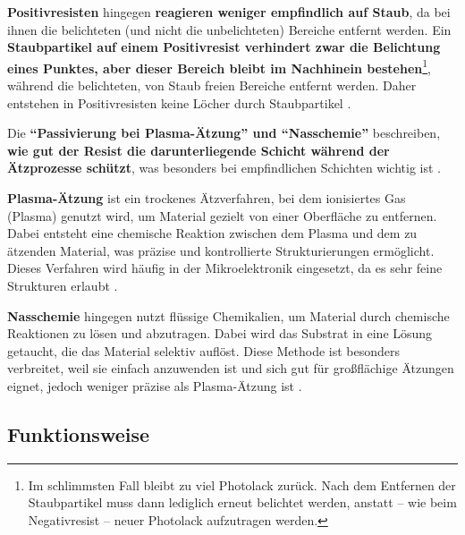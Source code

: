 \documentclass{article} %
\begin{document}
\textbf{Positivresisten} hingegen \textbf{reagieren weniger empfindlich auf Staub}, da bei ihnen die belichteten (und nicht die unbelichteten) Bereiche entfernt werden. Ein \textbf{Staubpartikel auf einem Positivresist verhindert zwar die Belichtung eines Punktes, aber dieser Bereich bleibt im Nachhinein bestehen}\footnote{Im schlimmsten Fall bleibt zu viel Photolack zurück. Nach dem Entfernen der Staubpartikel muss dann lediglich erneut belichtet werden, anstatt -- wie beim Negativresist -- neuer Photolack aufzutragen werden.}, während die belichteten, von Staub freien Bereiche entfernt werden. Daher entstehen in Positivresisten keine Löcher durch Staubpartikel \cite{wias_photoresist}.

\vspace{1em}

Die \textbf{``Passivierung bei Plasma-Ätzung'' und ``Nasschemie''} beschreiben, \textbf{wie gut der Resist die darunterliegende Schicht während der Ätzprozesse schützt}, was besonders bei empfindlichen Schichten wichtig ist \cite{schmid2024CVD}. 

\vspace{1em}

\textbf{Plasma-Ätzung} ist ein trockenes Ätzverfahren, bei dem ionisiertes Gas (Plasma) genutzt wird, um Material gezielt von einer Oberfläche zu entfernen. Dabei entsteht eine chemische Reaktion zwischen dem Plasma und dem zu ätzenden Material, was präzise und kontrollierte Strukturierungen ermöglicht. Dieses Verfahren wird häufig in der Mikroelektronik eingesetzt, da es sehr feine Strukturen erlaubt \cite{madou2002, wolf2000}.

\vspace{1em}

\textbf{Nasschemie} hingegen nutzt flüssige Chemikalien, um Material durch chemische Reaktionen zu lösen und abzutragen. Dabei wird das Substrat in eine Lösung getaucht, die das Material selektiv auflöst. Diese Methode ist besonders verbreitet, weil sie einfach anzuwenden ist und sich gut für großflächige Ätzungen eignet, jedoch weniger präzise als Plasma-Ätzung ist \cite{rogers2008, gerald2006}.





\vspace{1em}

\subsection{Funktionsweise}
\end{document}
